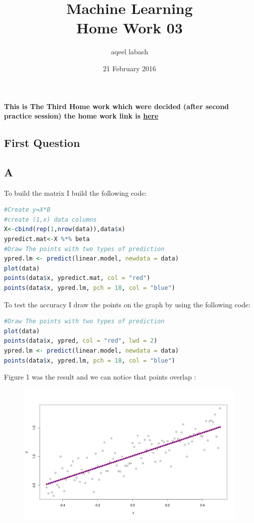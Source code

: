 \documentclass{article}
\title{Machine Learning\\ Home Work 03}
\author{aqeel labash}
\date{21 February 2016}
\begin{document}
	\maketitle
		\textbf{This is The Third Home work which were decided (after second practice session) the home work link is \href{https://courses.cs.ut.ee/MTAT.03.227/2016_spring/uploads/Main/home-exercises-3.pdf}{ here} }
\begin{multicols*}{2}
{\centering \section*{First Question}}
{\centering\subsection*{A}}
To build the matrix I build the following code:
\begin{lstlisting}[language=R]
#Create y=X*B
#create (1,x) data columns
X<-cbind(rep(1,nrow(data)),data$x)
ypredict.mat<-X %*% beta
#Draw The points with two types of prediction
ypred.lm <- predict(linear.model, newdata = data)
plot(data)
points(data$x, ypredict.mat, col = "red")
points(data$x, ypred.lm, pch = 18, col = "blue")
\end{lstlisting}
To test the accuracy I draw the points on the graph by using the following code:
\begin{lstlisting}[language=R]
#Draw The points with two types of prediction
plot(data)
points(data$x, ypred, col = "red", lwd = 2)
ypred.lm <- predict(linear.model, newdata = data)
points(data$x, ypred.lm, pch = 18, col = "blue")
\end{lstlisting}
Figure 1 was the result and we can notice that points overlap :
\begin{figure}[H]
\begin{center}
\includegraphics[scale=0.23]{plotpredictioncomparision.png}

\end{center}
\end{figure}
\end{multicols*}
\end{document}
